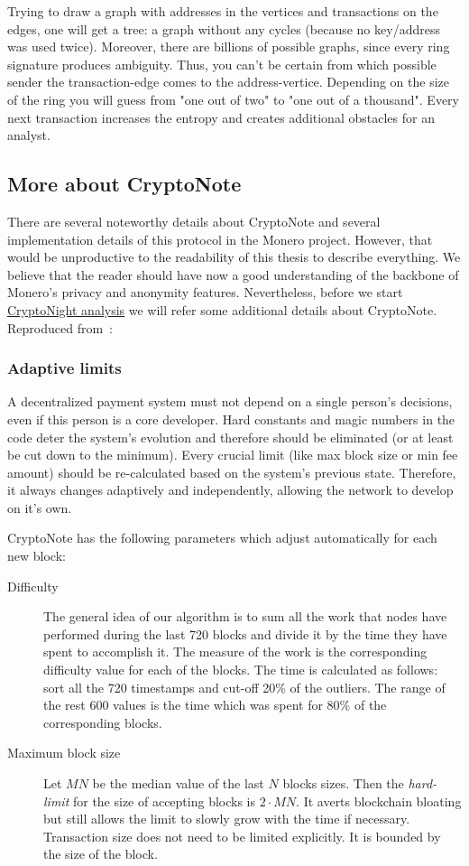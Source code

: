 Trying to draw a graph with addresses in the vertices and transactions on the edges, one will get a tree: a graph without any cycles (because no key/address was used twice). Moreover, there are billions of possible graphs, since every ring signature produces ambiguity. Thus, you can't be certain from which possible sender the transaction-edge comes to the address-vertice. Depending on the size of the ring you will guess from "one out of two" to "one out of a thousand". Every next transaction increases the entropy and creates additional obstacles for an analyst.

\subsection{More about CryptoNote}
There are several noteworthy details about CryptoNote and several implementation details of this protocol in the Monero project. However, that would be unproductive to the readability of this thesis to describe everything. We believe that the reader should have now a good understanding of the backbone of Monero's privacy and anonymity features. Nevertheless, before we start \hyperref[ch:cryptonight]{CryptoNight analysis} we will refer some additional details about CryptoNote. Reproduced from~\cite{cryptonote}:

\subsubsection{Adaptive limits}
A decentralized payment system must not depend on a single person's decisions, even if this person is a core developer. Hard constants and magic numbers in the code deter the system's evolution and therefore should be eliminated (or at least be cut down to the minimum). Every crucial limit (like max block size or min fee amount) should be re-calculated based on the system's previous state. Therefore, it always changes adaptively and independently, allowing the network to develop on it's own.

CryptoNote has the following parameters which adjust automatically for each new block:

\begin{description}
  \item [Difficulty] The general idea of our algorithm is to sum all the work that nodes have performed during the last 720 blocks and divide it by the time they have spent to accomplish it. The measure of the work is the corresponding difficulty value for each of the blocks. The time is calculated as follows: sort all the 720 timestamps and cut-off 20\% of the outliers. The range of the rest 600 values is the time which was spent for 80\% of the corresponding blocks.
  \item [Maximum block size] Let $MN$ be the median value of the last $N$ blocks sizes. Then the \emph{hard-limit} for the size of accepting blocks is $2 \cdot MN$. It averts blockchain bloating but still allows the limit to slowly grow with the time if necessary. Transaction size does not need to be limited explicitly. It is bounded by the size of the block.
\end{description}

